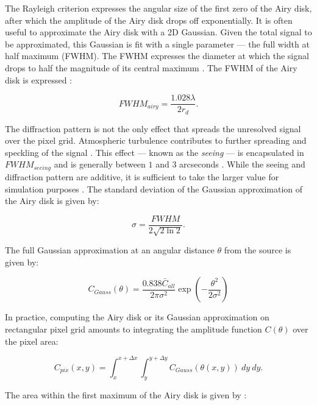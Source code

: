 The Rayleigh criterion expresses the angular size of the first zero of the Airy disk, after which the amplitude of the Airy disk drops off exponentially. It is often useful to approximate the Airy disk with a 2D Gaussian. Given the total signal to be approximated, this Gaussian is fit with a single parameter --- the full width at half maximum (FWHM). The FWHM expresses the diameter at which the signal drops to half the magnitude of its central maximum \cite{frueh2019notes}. The FWHM of the Airy disk is expressed \cite{frueh2019notes}:

\begin{equation} \label{eq:fwhm_airy}
  FWHM_{airy} = \frac{1.028 \lambda}{2 r_d}.
\end{equation}

The diffraction pattern is not the only effect that spreads the unresolved signal over the pixel grid. Atmospheric turbulence contributes to further spreading and speckling of the signal \cite{frueh2019notes}. This effect --- known as the \textit{seeing} --- is encapsulated in $FWHM_{seeing}$ and is generally between $1$ and $3$ arcseconds \cite{frueh2019notes}. While the seeing and diffraction pattern are additive, it is sufficient to take the larger value for simulation purposes \cite{frueh2019notes}. The standard deviation of the Gaussian approximation of the Airy disk is given by:

\begin{equation} \label{eq:airy_variance}
  \sigma = \frac{FWHM}{2 \sqrt{2 \ln{2}}}.
\end{equation}

The full Gaussian approximation at an angular distance $\theta$ from the source is given by:

\begin{equation} \label{eq:airy_gaussian}
  C_{Gauss}(\theta) = \frac{0.838 \bar{C}_{all}}{2 \pi \sigma^2} \exp\left( - \frac{\theta^2}{2 \sigma^2} \right)
\end{equation}

In practice, computing the Airy disk or its Gaussian approximation on rectangular pixel grid amounts to integrating the amplitude function $C(\theta)$ over the pixel area:

\begin{equation} \label{eq:pix_values_gauss}
  C_{pix}(x, y) = \int_{x}^{x + \Delta x} \int_{y}^{y + \Delta y}{C_{Gauss}(\theta(x, y))} \: dy \: dy.
\end{equation}

The area within the first maximum of the Airy disk is given by \cite{frueh2019notes}:

